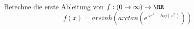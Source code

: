 Berechne die erste Ableitung von \(f:(0\to\infty )\to\RR\)
\[f(x)=arsinh(arctan(e^{5x^4-log(x^2)}))\]
\begin{solution}
    
\end{solution}